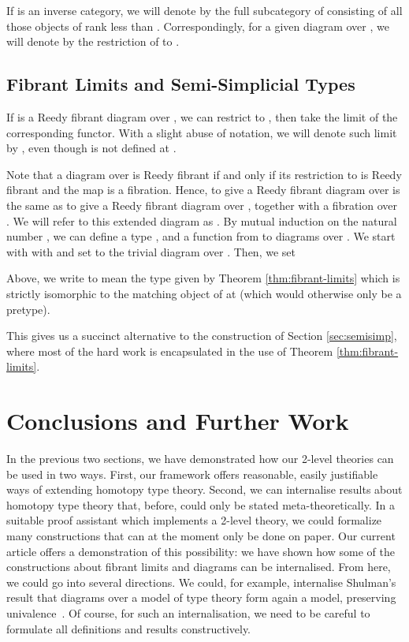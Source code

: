 \documentclass[a4paper,reqno]{amsart}
\newcommand{\op}[1]{#1^{\mathrm{op}}}
\theoremstyle{plain}
\theoremstyle{definition}
\begin{document}
If  is an inverse category, we will denote by  the full subcategory
of  consisting of all those objects of rank less than .  Correspondingly,
for a given diagram  over , we will denote by  the restriction of
 to .

\newcommand{\tdeltop}[1]{\left(\op{\Delta_+}\right)^{<#1}}

\subsection{Fibrant Limits and Semi-Simplicial Types}

If  is a Reedy fibrant diagram over , we can restrict  to , then take the limit of the corresponding functor.  With a slight
abuse of notation, we will denote such limit by , even though  is not
defined at .

Note that a diagram  over  is Reedy fibrant if and only if its
restriction to  is Reedy fibrant and the map  is a
fibration.  Hence, to give a Reedy fibrant diagram over  is the
same as to give a Reedy fibrant diagram  over , together with a
fibration  over .  We will refer to this extended diagram as .
By mutual induction on the natural number , we can define a type ,
and a function  from  to diagrams over .  We start
with with  and  set to the trivial diagram
over .
Then, we set

Above, we write  to mean the type given by Theorem
\ref{thm:fibrant-limits} which is strictly isomorphic to the matching object of
 at  (which would otherwise only be a pretype).

This gives us a succinct alternative to the construction of Section
\ref{sec:semisimp}, where most of the hard work is encapsulated in the use of
Theorem \ref{thm:fibrant-limits}.



\section{Conclusions and Further Work} \label{sec:conclusions}

In the previous two sections, we have demonstrated how our 2-level theories can be used in two ways. 
First, our framework offers reasonable, easily justifiable ways of extending homotopy type theory.
Second, we can internalise results about homotopy type theory that, before, could only be stated meta-theoretically. 
In a suitable proof assistant which implements a 2-level theory, we could formalize many constructions that can at the moment only be done on paper. 
Our current article offers a demonstration of this possibility: we have shown
how some of the constructions about fibrant limits and diagrams can be
internalised.
From here, we could go into several directions.
We could, for example, internalise Shulman's result that diagrams over a model of type theory form again a model, preserving univalence~\cite{shulman_inversediagrams}.
Of course, for such an internalisation, we need to be careful to formulate all definitions and results constructively.
\end{document}
